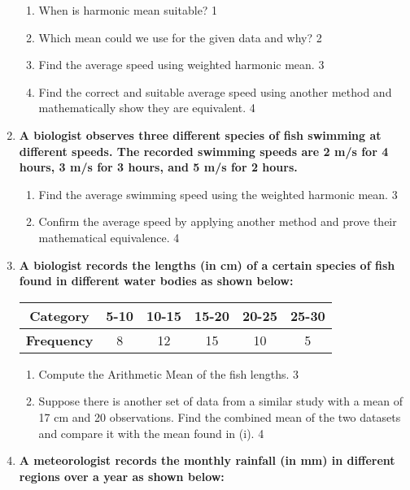 \documentclass[a4paper,oneside]{book}
\begin{document}
\begin{enumerate}
  \begin{enumerate}
    \item
	When is harmonic mean suitable? \hfill 1
    \item
	Which mean could we use for the given data and why? \hfill 2
    \item  
	Find the average speed using weighted harmonic mean. \hfill 3
    \item
	Find the correct and suitable average speed using another method and mathematically show they are equivalent. \hfill 4
  \end{enumerate}
  
  \item
\textbf{A biologist observes three different species of fish swimming at 
different speeds. The recorded swimming speeds are 2 m/s for 4 hours, 
3 m/s for 3 hours, and 5 m/s for 2 hours.}

\begin{enumerate}
    \item  
    Find the average swimming speed using the weighted harmonic mean. \hfill 3
    \item
    Confirm the average speed by applying another method and prove their 
    mathematical equivalence. \hfill 4
\end{enumerate}

\item
\textbf{A biologist records the lengths (in cm) of a certain species of 
fish found in different water bodies as shown below:}

\begin{table}[h]
\centering
\begin{tabular}{c|c|c|c|c|c}
\textbf{Category} & 5-10 & 10-15 & 15-20 & 20-25 & 25-30 \\ \hline
\textbf{Frequency} & 8    & 12    & 15    & 10    & 5     
\end{tabular}
\end{table}

\begin{enumerate}
    \item  
    Compute the Arithmetic Mean of the fish lengths. \hfill 3
    \item
    Suppose there is another set of data from a similar study with a mean of 17 cm and 20 observations. Find the combined mean of the two datasets and compare it with the mean found in (i). \hfill 4
\end{enumerate}

 \item
	  \textbf{A meteorologist records the monthly rainfall (in mm) in different regions over a year as shown below:}


\end{enumerate}
\end{document}

